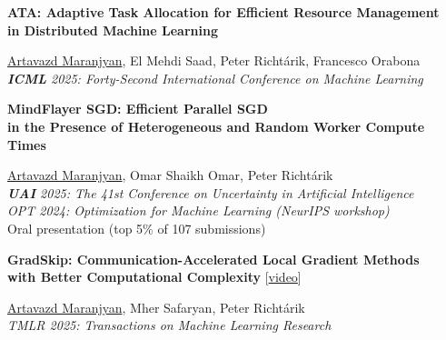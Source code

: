 \documentclass[10pt,a4paper,sans]{moderncv}        %
\newcommand{\red}{\color{cherry}}
\newcommand{\highlight}[1]{{\red #1}}
\begin{document}

{\parbox[t]{\linewidth}{\textbf{%
  ATA: Adaptive Task Allocation for Efficient Resource Management \\ in Distributed Machine Learning
  }}}
{}{}{}
{
  \normalsize \underline{Artavazd Maranjyan}, El Mehdi Saad, Peter Richtárik, Francesco Orabona \\
  \textit{\textbf{ICML} 2025: Forty-Second International Conference on Machine Learning}
}

{\parbox[t]{\linewidth}{\textbf{%
  MindFlayer SGD: Efficient Parallel SGD \\ in the Presence of Heterogeneous and Random Worker Compute Times
  }}}
{}{}{}
{
  \normalsize
  \underline{Artavazd Maranjyan}, Omar Shaikh Omar, Peter Richtárik \\
  \textit{\textbf{UAI} 2025: The 41st Conference on Uncertainty in Artificial Intelligence}\\
  \textit{OPT 2024: Optimization for Machine Learning (NeurIPS workshop)}\\
  \highlight{Oral presentation (top 5\% of 107 submissions)}
}

{\parbox[t]{\linewidth}{\textbf{%
  GradSkip: Communication-Accelerated Local Gradient Methods \\ with Better Computational Complexity
  } [{\href{https://youtu.be/WWhY5tO-FiM}{video}}] }}
{}{}{}
{
  \normalsize
  \underline{Artavazd Maranjyan}, Mher Safaryan, Peter Richtárik \\
  \textit{TMLR 2025: Transactions on Machine Learning Research}
}

\end{document}
